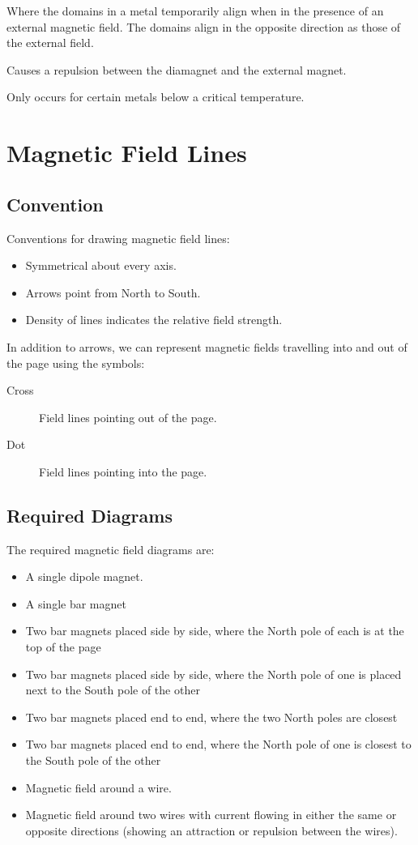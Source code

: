 \documentclass[a4paper,11pt]{article}
\begin{document}
Where the domains in a metal temporarily align when in the presence of an
external magnetic field.
The domains align in the opposite direction as those of the external field.

Causes a repulsion between the diamagnet and the external magnet.

Only occurs for certain metals below a critical temperature.




\section{Magnetic Field Lines}

\subsection{Convention}

Conventions for drawing magnetic field lines:

\begin{itemize}
\item Symmetrical about every axis.
\item Arrows point from North to South.
\item Density of lines indicates the relative field strength.
\end{itemize}

In addition to arrows, we can represent magnetic fields travelling into and
out of the page using the symbols:

\begin{description}
\item [Cross] Field lines pointing out of the page.
\item [Dot] Field lines pointing into the page.
\end{description}


\subsection{Required Diagrams}

The required magnetic field diagrams are:

\begin{itemize}
\item A single dipole magnet.
\item A single bar magnet
\item Two bar magnets placed side by side, where the North pole of each is at
	the top of the page
\item Two bar magnets placed side by side, where the North pole of one is placed
	next to the South pole of the other
\item Two bar magnets placed end to end, where the two North poles are closest
\item Two bar magnets placed end to end, where the North pole of one is closest
	to the South pole of the other
\item Magnetic field around a wire.
\item Magnetic field around two wires with current flowing in either the same
	or opposite directions (showing an attraction or repulsion between the
	wires).
\end{itemize}
\end{document}
